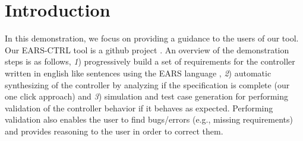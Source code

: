 \vspace{-1cm}
\section{Introduction}
\label{sec:intro}
\vspace{-.3cm}
In this demonstration, we focus on providing a guidance to the users of our
tool. Our \textsf{EARS-CTRL} tool is a github project \cite{EARSProject}.
An overview of the demonstration steps is as follows, \emph{1})
progressively build a set of requirements for the controller written in english
like sentences using the EARS language \cite{EARS}, \emph{2}) automatic
synthesizing of the controller by analyzing if the specification is complete
(our one click approach) and \emph{3}) simulation and test case generation for
performing validation of the controller behavior if it behaves as expected.
Performing validation also enables the user to find bugs/errors (e.g., missing
requirements) and provides reasoning to the user in order to correct them.
